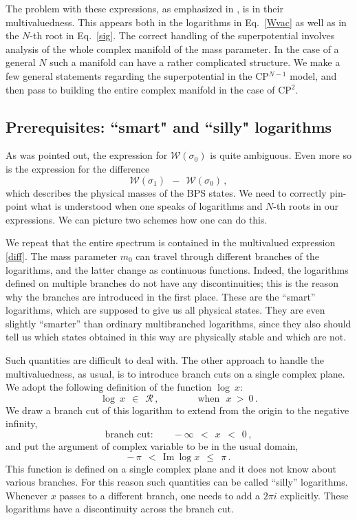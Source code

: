 \documentclass[epsfig,12pt]{article}
\def\beq{\begin{equation}}
\def\eeq{\end{equation}}
\def\beq{\begin{equation}}
\def\eeq{\end{equation}}
\newcommand{\mc}[1]{\mathcal{#1}}
\begin{document}
	The problem with these expressions, as emphasized in \cite{HaHo,SYtorkink,Bolokhov:2011mp}, is in their 
	multiva\-luedness.
	This appears both in the logarithms in Eq.~\eqref{Wvac} as well as in the $ N $-th root in Eq.~\eqref{sig}.
	The correct handling of the superpotential involves analysis of the whole complex manifold
	of the mass parameter.
	In the case of a general $ N $ such a manifold can have a rather complicated structure.
	We make a few general statements regarding the superpotential in the CP$^{N-1}$ model, and then pass
	to building the entire complex manifold in the case of CP$^2$.

\subsection{Prerequisites: ``smart" and ``silly" logarithms}

	As was pointed out, the expression for $ \mc{W}(\sigma_0) $ is quite ambiguous.
	Even more so is the expression for the difference
\beq
\label{diff}
	\mc{W}(\sigma_1) ~~-~~ \mc{W}(\sigma_0)\,,
\eeq
	which describes the physical masses of the BPS states.
	We need to correctly pin-point what is understood when one speaks of logarithms 
	and $ N $-th roots in our expressions.
	We can picture two schemes how one can do this. 

	We repeat that the entire spectrum is contained in the multivalued expression \eqref{diff}.
	The mass parameter $ m_0 $ can travel through different branches of the logarithms, and
	the latter change as continuous functions.
	Indeed, the logarithms defined on multiple branches do not have any discontinuities;
	this is the reason why the branches are introduced in the first place. 
	These are the ``smart'' logarithms, which are supposed to give us all physical states. 
	They are even slightly ``smarter'' than ordinary multibranched logarithms, since they also should tell us
	which states  obtained in this way are physically stable and which are not. 

	Such quantities are difficult to deal with. 
	The other approach to handle the multivaluedness, as usual, is to introduce branch cuts on a single complex plane. 
	We adopt the following definition of the function $ \log~x $:
\beq
	\log~x ~~\in~~ \mc{R}\,, \qquad\qquad \text{when~~} x ~>~ 0\,.
\eeq
	We draw a branch cut of this logarithm to extend from the origin to the negative infinity,
\beq
	\text{branch cut:}\qquad -\infty ~~<~~ x ~~<~~ 0\,,
\eeq
	and put the argument of complex variable to be in the usual domain,
\beq
	-\,\pi ~~<~~  \text{Im}~\log x  ~~\leq~~ \pi\,.
\eeq
	This function is defined on a single complex plane and it does not know about various branches.
	For this reason such quantities can be called ``silly'' logarithms.
	Whenever $ x $ passes to a different branch, one needs to add a $ 2 \pi i $ explicitly.
	These logarithms have a discontinuity across the branch cut.
\end{document}
